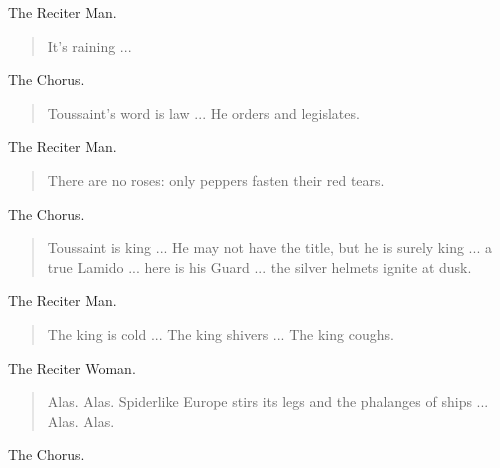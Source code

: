 \documentclass[letterpaper,article,12pt,oneside,notitlepage]{memoir}
\begin{document}
\begin{center}The Reciter Man.\end{center}

\begin{verse}
It's raining ... \\
\end{verse}

\begin{center}The Chorus.\end{center}

\begin{verse}
\indent Toussaint's word is law ... He orders and legislates. \\
\end{verse}

\begin{center}The Reciter Man.\end{center}

\begin{verse}
\indent There are no roses: only peppers fasten their red tears. \\
\end{verse}

\begin{center}The Chorus.\end{center}

\begin{verse}
\indent Toussaint is king ... He may not have the title, but he is surely king ... a true Lamido ... here is his Guard ... the silver helmets ignite at dusk. \\
\end{verse}

\begin{center}The Reciter Man.\end{center}

\begin{verse}
The king is cold ... The king shivers ... The king coughs. \\
\end{verse}

\begin{center}The Reciter Woman.\end{center}

\begin{verse}
\indent Alas. Alas. Spiderlike Europe stirs its legs and the phalanges of ships ... Alas. Alas. \\
\end{verse}

\begin{center}The Chorus.\end{center}
\end{document}
